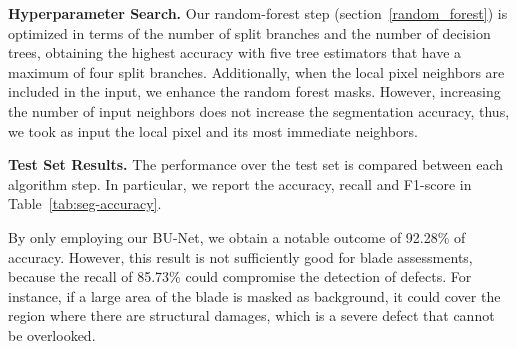 












\textbf{Hyperparameter Search.} Our random-forest step (section~\ref{random_forest}) is optimized in terms of the number of split branches and the number of decision trees, obtaining the highest accuracy with five tree estimators that have a maximum of four split branches. Additionally, when the local pixel neighbors are included in the input, we enhance the random forest masks. However, increasing the number of input neighbors does not increase the segmentation accuracy, thus, we took as input the local pixel and its most immediate neighbors. 

\textbf{Test Set Results.} The performance over the test set is compared between each algorithm step. In particular, we report the accuracy, recall and F1-score in Table~\ref{tab:seg-accuracy}. 

\vspace{-1.5cm}
By only employing our BU-Net, we obtain a notable outcome of 92.28\% of accuracy. However, this result is not sufficiently good for blade assessments, because the recall of 85.73\% could compromise the detection of defects. For instance, if a large area of the blade is masked as background, it could cover the region where there are structural damages, which is a severe defect that cannot be overlooked.

